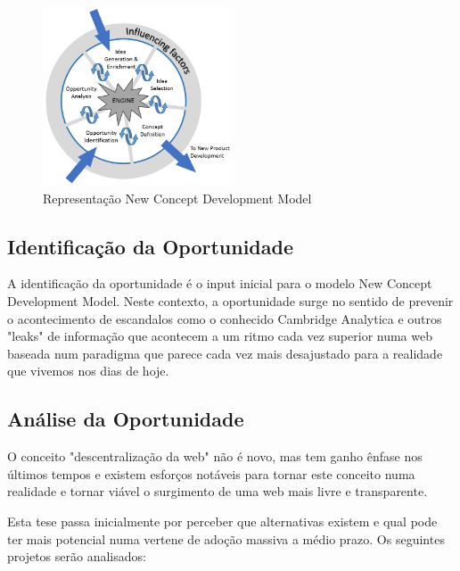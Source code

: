 \begin{figure}[h]
    \begin{center}
    \includegraphics[width=0.5\textwidth]{figures/The-New-Concept-Development-NCD-model-Koen-et-al-2001.png}
    \caption{Representação New Concept Development Model}
    \end{center}
\end{figure}

\subsection{Identificação da Oportunidade}
A identificação da oportunidade é o input inicial para o modelo New Concept Development Model.
Neste contexto, a oportunidade surge no sentido de prevenir o acontecimento de escandalos como o conhecido Cambridge Analytica e outros "leaks" de informação que acontecem a um ritmo cada vez superior numa web baseada num paradigma que parece cada vez mais desajustado para a realidade que vivemos nos dias de hoje.

\subsection{Análise da Oportunidade}
O conceito "descentralização da web" não é novo, mas tem ganho ênfase nos últimos tempos e existem esforços notáveis para tornar este conceito numa realidade e tornar viável o surgimento de uma web mais livre e transparente.

Esta tese passa inicialmente por perceber que alternativas existem e qual pode ter mais potencial numa vertene de adoção massiva a médio prazo. Os seguintes projetos serão analisados:


